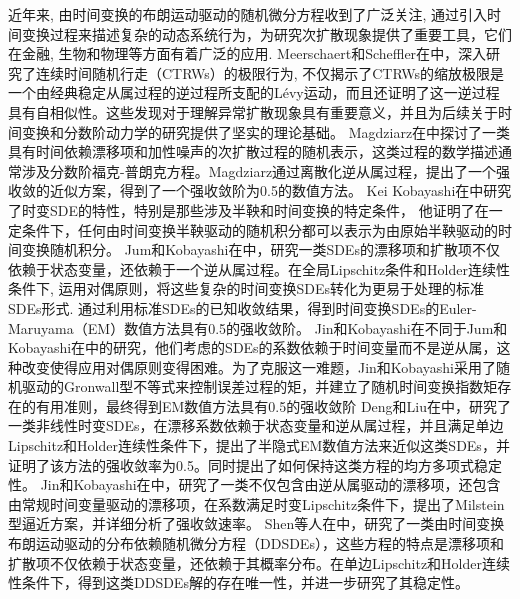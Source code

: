 %


近年来, 由时间变换的布朗运动驱动的随机微分方程收到了广泛关注, 通过引入时间变换过程来描述复杂的动态系统行为，为研究次扩散现象提供了重要工具，它们在金融, 生物和物理等方面有着广泛的应用. 
Meerschaert和Scheffler在\cite{meerschaert2004limit}中，深入研究了连续时间随机行走（CTRWs）的极限行为, 不仅揭示了CTRWs的缩放极限是一个由经典稳定从属过程的逆过程所支配的Lévy运动，而且还证明了这一逆过程具有自相似性。这些发现对于理解异常扩散现象具有重要意义，并且为后续关于时间变换和分数阶动力学的研究提供了坚实的理论基础。
Magdziarz在\cite{magdziarz2009stochastic}中探讨了一类具有时间依赖漂移项和加性噪声的次扩散过程的随机表示，这类过程的数学描述通常涉及分数阶福克-普朗克方程。Magdziarz通过离散化逆从属过程，提出了一个强收敛的近似方案，得到了一个强收敛阶为0.5的数值方法。
Kei Kobayashi在\cite{kobayashi2011stochastic}中研究了时变SDE的特性，特别是那些涉及半鞅和时间变换的特定条件， 他证明了在一定条件下，任何由时间变换半鞅驱动的随机积分都可以表示为由原始半鞅驱动的时间变换随机积分。
Jum和Kobayashi在\cite{jum2014strong}中，研究一类SDEs的漂移项和扩散项不仅依赖于状态变量，还依赖于一个逆从属过程。在全局Lipschitz条件和Holder连续性条件下, 运用对偶原则，将这些复杂的时间变换SDEs转化为更易于处理的标准SDEs形式. 通过利用标准SDEs的已知收敛结果，得到时间变换SDEs的Euler-Maruyama（EM）数值方法具有0.5的强收敛阶。
Jin和Kobayashi在\cite{jin2019strong}不同于Jum和Kobayashi在\cite{jum2014strong}中的研究，他们考虑的SDEs的系数依赖于时间变量而不是逆从属，这种改变使得应用对偶原则变得困难。为了克服这一难题，Jin和Kobayashi采用了随机驱动的Gronwall型不等式来控制误差过程的矩，并建立了随机时间变换指数矩存在的有用准则，最终得到EM数值方法具有0.5的强收敛阶
Deng和Liu在\cite{deng2020semi}中，研究了一类非线性时变SDEs，在漂移系数依赖于状态变量和逆从属过程，并且满足单边Lipschitz和Holder连续性条件下，提出了半隐式EM数值方法来近似这类SDEs，并证明了该方法的强收敛率为0.5。同时提出了如何保持这类方程的均方多项式稳定性。
Jin和Kobayashi在\cite{jin2021strong}中，研究了一类不仅包含由逆从属驱动的漂移项，还包含由常规时间变量驱动的漂移项，在系数满足时变Lipschitz条件下，提出了Milstein型逼近方案，并详细分析了强收敛速率。
Shen等人在\cite{shen2023class}中，研究了一类由时间变换布朗运动驱动的分布依赖随机微分方程（DDSDEs），这些方程的特点是漂移项和扩散项不仅依赖于状态变量，还依赖于其概率分布。在单边Lipschitz和Holder连续性条件下，得到这类DDSDEs解的存在唯一性，并进一步研究了其稳定性。
